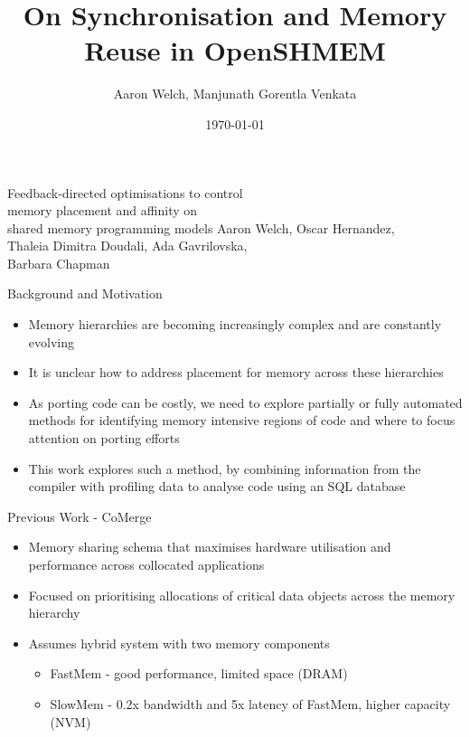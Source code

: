 \documentclass[final]{beamer}
\title{On Synchronisation and Memory Reuse in OpenSHMEM}
\author{Aaron Welch\inst{1}, Manjunath Gorentla Venkata\inst{1}}
\institute{Extreme Scale Systems Center\\
Oak Ridge National Laboratory\\
\email{\{welchda, manjugv\}@ornl.gov}
}
\date{\today}
\let\olditem\item
\renewcommand{\item}{\vspace{\fill}\olditem}
\begin{document}
\begin{frame}{\hspace{0.02\paperwidth}Feedback-directed optimisations to control\\\hspace{0.02\paperwidth}memory placement and affinity on\\\hspace{0.02\paperwidth}shared memory programming models}
Aaron Welch, Oscar Hernandez,\\Thaleia Dimitra Doudali, Ada Gavrilovska,\\Barbara Chapman
\end{frame}

\begin{frame}{\hspace{0.02\paperwidth}Background and Motivation}
\begin{itemize}
\item Memory hierarchies are becoming increasingly complex and are constantly evolving
\item It is unclear how to address placement for memory across these hierarchies
\item As porting code can be costly, we need to explore partially or fully automated methods for identifying memory intensive regions of code and where to focus attention on porting efforts
\item This work explores such a method, by combining information from the compiler with profiling data to analyse code using an \acs{SQL} database
\end{itemize}
\end{frame}

\begin{frame}{\hspace{0.02\paperwidth}Previous Work - CoMerge}
\begin{itemize}
\item Memory sharing schema that maximises hardware utilisation and performance across collocated applications
\item Focused on prioritising allocations of critical data objects across the memory hierarchy
\item Assumes hybrid system with two memory components
\begin{itemize}
\item FastMem - good performance, limited space (DRAM)
\item SlowMem - 0.2x bandwidth and 5x latency of FastMem, higher capacity (\acs{NVM})
\end{itemize}
\end{itemize}
\end{frame}
\end{document}
